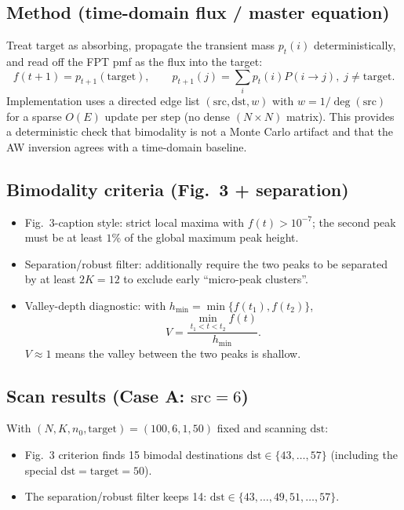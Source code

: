 
\newcommand{\FluxCaseAFigDir}{figures/bimodality_flux_scan/N100K6_n0_1_target_50_src_6/latest}
\newcommand{\FluxCaseADataDir}{data/bimodality_flux_scan/N100K6_n0_1_target_50_src_6/latest}
\newcommand{\FluxCaseBFigDir}{figures/bimodality_flux_scan/N100K6_n0_1_target_50_src_1/latest}
\newcommand{\FluxCaseBDataDir}{data/bimodality_flux_scan/N100K6_n0_1_target_50_src_1/latest}

\subsection{Method (time-domain flux / master equation)}
Treat $\mathrm{target}$ as absorbing, propagate the transient mass $p_t(i)$ deterministically, and read off the FPT pmf as the flux into the target:
\[
  f(t+1)=p_{t+1}(\mathrm{target}),\qquad
  p_{t+1}(j)=\sum_i p_t(i)P(i\to j),\; j\ne\mathrm{target}.
\]
Implementation uses a directed edge list $(\mathrm{src},\mathrm{dst},w)$ with $w=1/\deg(\mathrm{src})$ for a sparse $O(E)$ update per step (no dense $(N\times N)$ matrix).
This provides a deterministic check that bimodality is not a Monte Carlo artifact and that the AW inversion agrees with a time-domain baseline.

\subsection{Bimodality criteria (Fig.~3 + separation)}
\begin{itemize}
  \item Fig.~3-caption style: strict local maxima with $f(t)>10^{-7}$; the second peak must be at least $1\%$ of the global maximum peak height.
  \item Separation/robust filter: additionally require the two peaks to be separated by at least $2K=12$ to exclude early ``micro-peak clusters''.
  \item Valley-depth diagnostic: with $h_{\min}=\min\{f(t_1),f(t_2)\}$,
  \[
    V=\frac{\min_{t_1<t<t_2} f(t)}{h_{\min}}.
  \]
  $V\approx 1$ means the valley between the two peaks is shallow.
\end{itemize}

\subsection{Scan results (Case A: $\mathrm{src}=6$)}
With $(N,K,n_0,\mathrm{target})=(100,6,1,50)$ fixed and scanning $\mathrm{dst}$:
\begin{itemize}
  \item Fig.~3 criterion finds 15 bimodal destinations $\mathrm{dst}\in\{43,\dots,57\}$ (including the special $\mathrm{dst}=\mathrm{target}=50$).
  \item The separation/robust filter keeps 14: $\mathrm{dst}\in\{43,\dots,49,51,\dots,57\}$.
\end{itemize}

